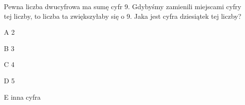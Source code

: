 \begin{tresc}
Pewna liczba dwucyfrowa ma sumę cyfr 9. Gdybyśmy zamienili miejscami cyfry tej liczby, to liczba ta zwiększyłaby się o 9. Jaka jest cyfra dziesiątek tej liczby?
\end{tresc}
\begin{wariant}{A} 2 \end{wariant}
\begin{wariant}{B} 3 \end{wariant}
\begin{wariant}{C} 4 \end{wariant}
\begin{wariant}{D} 5 \end{wariant}
\begin{wariant}{E} inna cyfra \end{wariant}
